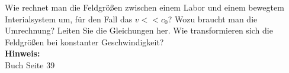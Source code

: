 \begin{question}[section=2,subsection=22,name={Bewegtes System},difficulty=4,type=mdl,tags={}]
	Wie rechnet man die Feldgrößen zwischen einem Labor und einem bewegtem Interialsystem um, für den Fall das $v << c_0$? Wozu braucht man die Umrechnung? Leiten Sie die Gleichungen her. Wie transformieren sich die Feldgrößen bei konstanter Geschwindigkeit?
	\\ \textbf{Hinweis:}\\
	Buch Seite 39
\end{question}
\begin{solution}
	
\end{solution}